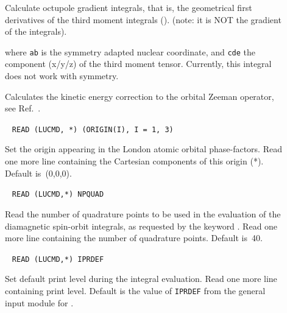 \begin{description}
\item[]
Calculate octupole gradient integrals, that is, the geometrical first
derivatives of the third moment integrals ().
(note: it is NOT the gradient of the  integrals).

where \verb|ab| is the symmetry adapted nuclear coordinate, and \verb|cde| the
component (x/y/z) of the third moment tensor. Currently, this integral
does not work with symmetry.

\item[] Calculates the kinetic energy correction to the
  orbital Zeeman operator, see Ref.~\cite{pmpljvkrjcp119}.


\item[]\verb| |\newline
\verb|READ (LUCMD, *) (ORIGIN(I), I = 1, 3)|

Set the origin appearing in the London atomic orbital phase-factors.
Read one more line containing the Cartesian components of this origin (*).
Default is~(0,0,0).

\item[]\verb| |\newline
\verb|READ (LUCMD,*) NPQUAD|

Read the number of quadrature points to be
used in the evaluation of
the diamagnetic spin-orbit integrals, as
requested by the keyword
. Read one more line containing the number of quadrature
points. Default is~40.

\item[]\verb| |\newline
\verb|READ (LUCMD,*) IPRDEF|

Set default print level during the integral evaluation.  Read one more line
containing print level. Default is the value of \verb|IPRDEF|
from the general input module for {\dalton}.


\end{description}
